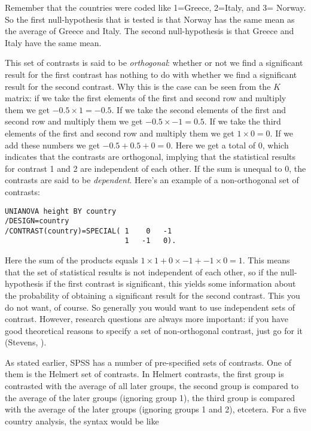Remember that the countries were coded like 1=Greece, 2=Italy, and 3= Norway. So the first null-hypothesis that is tested is that Norway has the same mean as the average of Greece and Italy. The second null-hypothesis is that Greece and Italy have the same mean.

This set of contrasts is said to be \textit{orthogonal}: whether or not we find a significant result for the first contrast has nothing to do with whether we find a significant result for the second contrast. Why this is the case can be seen from the $K$ matrix: if we take the first elements of the first and second row and multiply them we get $-0.5 \times 1 = -0.5$. If we take the second elements of the first and second row and multiply them we get $-0.5 \times -1 = 0.5$. If we take the third elements of the first and second row and multiply them we get $1 \times 0 = 0$. If we add these numbers we get $-0.5 + 0.5 +0= 0 $. Here we get a total of 0, which indicates that the contrasts are orthogonal, implying that the statistical results for contrast 1 and 2 are independent of each other. If the sum is unequal to 0, the contrasts are said to be \textit{dependent}. 
Here's an example of a non-orthogonal set of contrasts:

\begin{verbatim}
UNIANOVA height BY country
/DESIGN=country
/CONTRAST(country)=SPECIAL( 1    0   -1
                            1   -1   0).
\end{verbatim}

Here the sum of the products equals $1\times 1 +0\times -1 + -1 \times 0 =1$. This means that the set of statistical results is not independent of each other, so if the null-hypothesis if the first contrast is significant, this yields some information about the probability of obtaining a significant result for the second contrast. This you do not want, of course. So generally you would want to use independent sets of contrast. However, research questions are always more important: if you have good theoretical reasons to specify a set of non-orthogonal contrast, just go for it (Stevens, ).

As stated earlier, SPSS has a number of pre-specified sets of contrasts. One of them is the Helmert set of contrasts. In Helmert contrasts, the first group is contrasted with the average of all later groups, the second group is compared to the average of the later groups (ignoring group 1), the third group is compared with the average of the later groups (ignoring groups 1 and 2), etcetera. For a five country analysis, the syntax would be like


